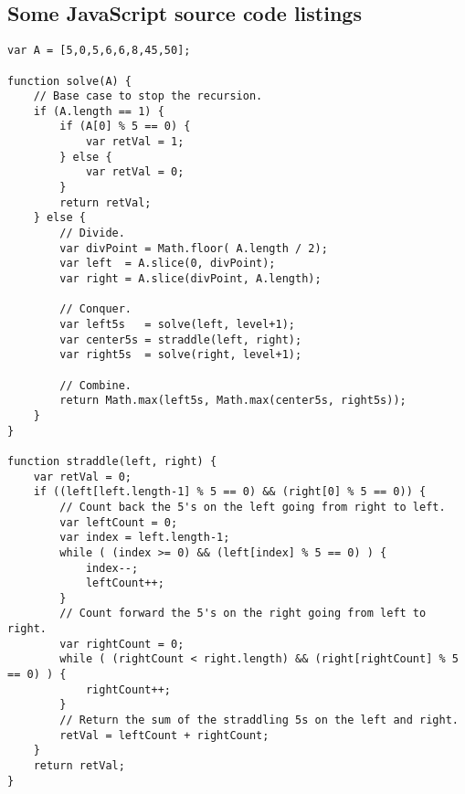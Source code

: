 \documentclass[letterpaper, 10pt,DIV=13]{scrartcl}
\numberwithin{equation}{section} %
\numberwithin{figure}{section} %
\numberwithin{table}{section} %
\begin{document}
\subsection{Some JavaScript source code listings}

\lstset{numbers=left, numberstyle=\tiny, stepnumber=1, numbersep=5pt, basicstyle=\footnotesize\ttfamily}
\begin{lstlisting}[frame=single, ]  
var A = [5,0,5,6,6,8,45,50];

function solve(A) {
    // Base case to stop the recursion.
    if (A.length == 1) {
        if (A[0] % 5 == 0) {
            var retVal = 1;
        } else {
            var retVal = 0;
        }
        return retVal;
    } else {
        // Divide.
        var divPoint = Math.floor( A.length / 2);
        var left  = A.slice(0, divPoint);
        var right = A.slice(divPoint, A.length);
        
        // Conquer.
        var left5s   = solve(left, level+1);
        var center5s = straddle(left, right);
        var right5s  = solve(right, level+1);             
        
        // Combine.
        return Math.max(left5s, Math.max(center5s, right5s));
    }
}

function straddle(left, right) {
    var retVal = 0;
    if ((left[left.length-1] % 5 == 0) && (right[0] % 5 == 0)) {
        // Count back the 5's on the left going from right to left.
        var leftCount = 0;
        var index = left.length-1;
        while ( (index >= 0) && (left[index] % 5 == 0) ) {
            index--;
            leftCount++;
        }
        // Count forward the 5's on the right going from left to right.
        var rightCount = 0;
        while ( (rightCount < right.length) && (right[rightCount] % 5 == 0) ) {
            rightCount++;
        }
        // Return the sum of the straddling 5s on the left and right.
        retVal = leftCount + rightCount;
    }
    return retVal;
}
\end{lstlisting}
\end{document}
